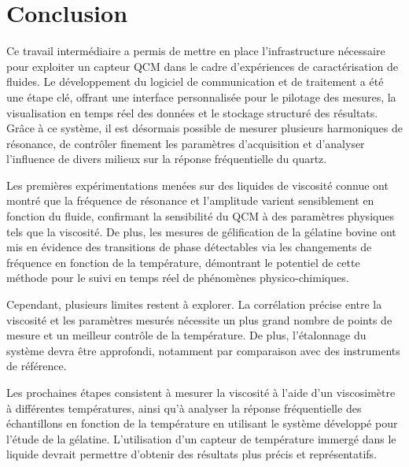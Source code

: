 \chapter{Conclusion}

Ce travail intermédiaire a permis de mettre en place l’infrastructure nécessaire pour exploiter un capteur QCM dans le cadre d’expériences de caractérisation de fluides. Le développement du logiciel de communication et de traitement a été une étape clé, offrant une interface personnalisée pour le pilotage des mesures, la visualisation en temps réel des données et le stockage structuré des résultats. Grâce à ce système, il est désormais possible de mesurer plusieurs harmoniques de résonance, de contrôler finement les paramètres d’acquisition et d’analyser l’influence de divers milieux sur la réponse fréquentielle du quartz.

Les premières expérimentations menées sur des liquides de viscosité connue ont montré que la fréquence de résonance et l’amplitude varient sensiblement en fonction du fluide, confirmant la sensibilité du QCM à des paramètres physiques tels que la viscosité. De plus, les mesures de gélification de la gélatine bovine ont mis en évidence des transitions de phase détectables via les changements de fréquence en fonction de la température, démontrant le potentiel de cette méthode pour le suivi en temps réel de phénomènes physico-chimiques.

Cependant, plusieurs limites restent à explorer. La corrélation précise entre la viscosité et les paramètres mesurés nécessite un plus grand nombre de points de mesure et un meilleur contrôle de la température. De plus, l’étalonnage du système devra être approfondi, notamment par comparaison avec des instruments de référence.

Les prochaines étapes consistent à mesurer la viscosité à l’aide d’un viscosimètre à différentes températures, ainsi qu’à analyser la réponse fréquentielle des échantillons en fonction de la température en utilisant le système développé pour l’étude de la gélatine. L’utilisation d’un capteur de température immergé dans le liquide devrait permettre d’obtenir des résultats plus précis et représentatifs.




\vfil
\hspace{8cm}\makeatletter\@author\makeatother\par
\hspace{8cm}\begin{minipage}{5cm}
    \printsignature
\end{minipage}